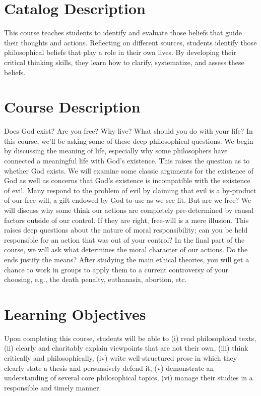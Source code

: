 \documentclass[article,oneside]{memoir}
\begin{document}
\section{Catalog Description}

This course teaches students to identify and evaluate those beliefs that guide their thoughts and actions. Reflecting on different sources, students identify those philosophical beliefs that play a role in their own lives. By developing their critical thinking skills, they learn how to clarify, systematize, and assess these beliefs. 

\section{Course Description}

Does God exist? Are you free? Why live? What should you do with your life?  In this course, we'll be asking some of these deep philosophical questions. We begin by discussing the meaning of life, especially why some philosophers have connected a meaningful life with God's existence. This raises the question as to whether God exists. We will examine some classic arguments for the existence of God as well as concerns that God's existence is incompatible with the existence of evil. Many respond to the problem of evil by claiming that evil is a by-product of our free-will, a gift endowed by God to use as we see fit. But are we free? We will discuss why some think our actions are completely pre-determined by causal factors outside of our control. If they are right, free-will is a mere illusion. This raises deep questions about the nature of moral responsibility; can you be held responsible for an action that was out of your control? In the final part of the course, we will ask what determines the moral character of our actions. Do the ends justify the means? After studying the main ethical theories, you will get a chance to work in groups to apply them to a current controversy of your choosing, e.g., the death penalty, euthanasia, abortion, etc. 

\section{Learning Objectives}

Upon completing this course, students will be able to (i) read philosophical texts, (ii) clearly and charitably explain viewpoints that are not their own, (iii) think critically and philosophically, (iv) write well-structured prose in which they clearly state a thesis and persuasively defend it, (v) demonstrate an understanding of several core philosophical topics, (vi) manage their studies in a responsible and timely manner. 
\end{document}
